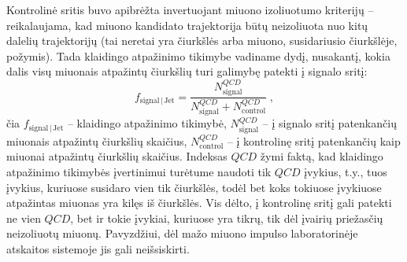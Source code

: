 \documentclass[a4paper, 12pt, oneside]{article}
\newcommand{\QCD}{QC\! D}
\newlength\q
\begin{document}
Kontrolinė sritis buvo apibrėžta invertuojant miuono izoliuotumo kriterijų -- reikalaujama, kad miuono kandidato
trajektorija būtų neizoliuota nuo kitų dalelių trajektorijų (tai neretai yra čiurkšlės arba miuono, susidariusio čiurkšlėje, požymis).
Tada klaidingo atpažinimo tikimybe vadiname dydį, nusakantį, kokia dalis visų miuonais atpažintų čiurkšlių turi galimybę patekti
į signalo sritį:
\begin{equation} \label{eq:FR}
	f_{\mathrm{signal} \,| \,\mathrm{Jet}} =
	\frac{N^{\QCD}_{\mathrm{signal}}}{N^{\QCD}_{\mathrm{signal}}+N^{\QCD}_{\mathrm{control}}} \; ,
\end{equation}
čia $f_{\mathrm{signal} \,| \,\mathrm{Jet}}$ -- klaidingo atpažinimo tikimybė, $N^{\QCD}_{\mathrm{signal}}$ -- į signalo sritį
patenkančių miuonais atpažintų čiurkšlių skaičius, $N^{\QCD}_{\mathrm{control}}$ -- į kontrolinę sritį patenkančių kaip miuonai
atpažintų čiurkšlių skaičius.
Indeksas $\QCD$ žymi faktą, kad klaidingo atpažinimo tikimybės įvertinimui turėtume naudoti tik $\QCD$ įvykius, t.y., tuos
įvykius, kuriuose susidaro vien tik čiurkšlės, todėl bet koks tokiuose įvykiuose atpažintas miuonas yra kilęs iš čiurkšlės.
Vis dėlto, į kontrolinę sritį gali patekti ne vien $\QCD$, bet ir tokie įvykiai, kuriuose yra tikrų, tik dėl įvairių
priežasčių neizoliuotų miuonų.
Pavyzdžiui, dėl mažo miuono impulso laboratorinėje atskaitos sistemoje jis gali neišsiskirti.
\end{document}
